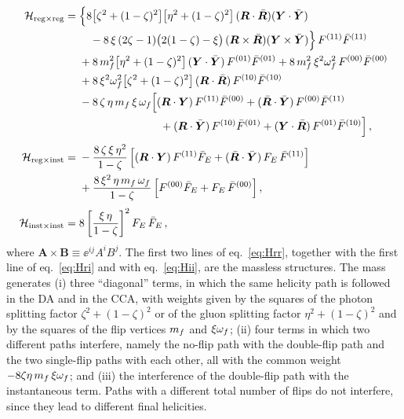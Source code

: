 \begin{subequations}
\label{eq:H-direct}
\begin{align}
\mathcal{H}_{\rm reg\times reg}={}&\Big\{8\big[\zeta^2+(1-\zeta)^2\big]\big[\eta^2+(1-\zeta)^2\big]\,
(\bm{R}\cdot\bar{\bm{R}})(\bm{Y}\cdot\bar{\bm{Y}})
\nonumber\\
&\quad-8\,\xi\,(2\zeta-1)\big(2(1-\zeta)-\xi\big)\,(\bm{R}\times\bar{\bm{R}})(\bm{Y}\times\bar{\bm{Y}})\Big\}\,F^{(11)}\bar F^{(11)}
\nonumber\\
&+8\,m_f^2\big[\eta^2+(1-\zeta)^2\big]\,(\bm{Y}\cdot\bar{\bm{Y}})\,F^{(01)}\bar F^{(01)}
+8\,m_f^2\,\xi^2\omega_f^2\,F^{(00)}\bar F^{(00)}
\nonumber\\
&+8\,\xi^2\omega_f^2\big[\zeta^2+(1-\zeta)^2\big]\,(\bm{R}\cdot\bar{\bm{R}})\,F^{(10)}\bar F^{(10)}
\nonumber\\
&-8\,\zeta\,\eta\,m_f\,\xi\,\omega_f\Big[(\bm{R}\cdot\bm{Y})\,F^{(11)}\bar F^{(00)}+(\bar{\bm{R}}\cdot\bar{\bm{Y}})\,F^{(00)}\bar F^{(11)}
\nonumber\\
&\hspace{2.6cm}+(\bm{R}\cdot\bar{\bm{Y}})\,F^{(10)}\bar F^{(01)}+(\bm{Y}\cdot\bar{\bm{R}})\,F^{(01)}\bar F^{(10)}\Big]\,,
\label{eq:Hrr}\\[1mm]
\mathcal{H}_{\rm reg\times inst}={}&-\frac{8\,\zeta\,\xi\,\eta^2}{1-\zeta}\,
\Big[(\bm{R}\cdot\bm{Y})\,F^{(11)}\bar F_E+(\bar{\bm{R}}\cdot\bar{\bm{Y}})\,F_E\,\bar F^{(11)}\Big]
\nonumber\\
&+\frac{8\,\xi^2\,\eta\,m_f\,\omega_f}{1-\zeta}\,\Big[F^{(00)}\bar F_E+F_E\,\bar F^{(00)}\Big]\,,
\label{eq:Hri}\\[1mm]
\mathcal{H}_{\rm inst\times inst}={}&8\left[\frac{\xi\,\eta}{1-\zeta}\right]^2F_E\,\bar F_E\,,
\label{eq:Hii}
\end{align}
\end{subequations}
where $\bm{A}\times\bm{B}\equiv\ee^{ij}A^iB^j$. The first two lines of eq.~\eqref{eq:Hrr}, together
with the first line of eq.~\eqref{eq:Hri} and with eq.~\eqref{eq:Hii}, are the massless structures. The
mass generates (i) three ``diagonal'' terms, in which the same helicity path is followed in the DA and
in the CCA, with weights given by the squares of the photon splitting factor
$\zeta^2+(1-\zeta)^2$ or of the gluon splitting factor $\eta^2+(1-\zeta)^2$ and by the squares of the
flip vertices $m_f$ and $\xi\omega_f$; (ii) four terms in which two different paths interfere, namely the
no-flip path with the double-flip path and the two single-flip paths with each other, all with the
common weight $-8\zeta\eta\,m_f\,\xi\omega_f$; and (iii) the interference of the double-flip path with the
instantaneous term. Paths with a different total number of flips do not interfere, since they lead to
different final helicities.

